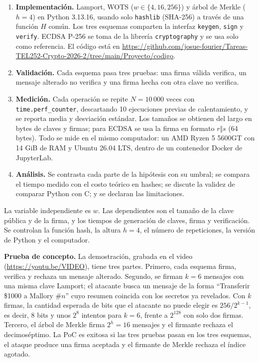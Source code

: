 \documentclass[12pt,letterpaper]{article}
\newcommand{\urlcodigo}{\url{https://github.com/josue-fourier/Tareas-TEL252-Crypto-2026-2/tree/main/Proyecto/codigo}}
\newcommand{\urlvideo}{\url{https://youtu.be/VIDEO}}             %
\begin{document}
\begin{enumerate}
  \item \textbf{Implementación.} Lamport, WOTS ($w\in\{4,16,256\}$) y árbol de Merkle ($h=4$) en Python 3.13.16, usando solo \texttt{hashlib} (SHA-256) a través de una función $H$ común. Los tres esquemas comparten la interfaz \texttt{keygen}, \texttt{sign} y \texttt{verify}. ECDSA P-256 se toma de la librería \texttt{cryptography} y se usa solo como referencia. El código está en \urlcodigo.
  \item \textbf{Validación.} Cada esquema pasa tres pruebas: una firma válida verifica, un mensaje alterado no verifica y una firma hecha con otra clave no verifica.
  \item \textbf{Medición.} Cada operación se repite $N=10\,000$ veces con \texttt{time.perf\_counter}, descartando 10 ejecuciones previas de calentamiento, y se reporta media y desviación estándar. Los tamaños se obtienen del largo en bytes de claves y firmas; para ECDSA se usa la firma en formato $r\Vert s$ (64 bytes). Todo se mide en el mismo computador: un AMD Ryzen 5 5600GT con 14 GiB de RAM y Ubuntu 26.04 LTS, dentro de un contenedor Docker de JupyterLab.
  \item \textbf{Análisis.} Se contrasta cada parte de la hipótesis con su umbral; se compara el tiempo medido con el costo teórico en hashes; se discute la validez de comparar Python con C; y se declaran las limitaciones.
\end{enumerate}

La variable independiente es $w$. Las dependientes son el tamaño de la clave pública y de la firma, y los tiempos de generación de claves, firma y verificación. Se controlan la función hash, la altura $h=4$, el número de repeticiones, la versión de Python y el computador.

\textbf{Prueba de concepto.} La demostración, grabada en el video (\urlvideo), tiene tres partes. Primero, cada esquema firma, verifica y rechaza un mensaje alterado. Segundo, se firman $k=6$ mensajes con una misma clave Lamport; el atacante busca un mensaje de la forma \enquote{Transferir \$1000 a Mallory \#$n$} cuyo resumen coincida con los secretos ya revelados. Con $k$ firmas, la cantidad esperada de bits que el atacante no puede elegir es $256/2^{k-1}$, es decir, 8 bits y unos $2^{8}$ intentos para $k=6$, frente a $2^{128}$ con solo dos firmas. Tercero, el árbol de Merkle firma $2^h=16$ mensajes y el firmante rechaza el decimoséptimo. La PoC es exitosa si las tres pruebas pasan en los tres esquemas, el ataque produce una firma aceptada y el firmante de Merkle rechaza el índice agotado.
\end{document}
